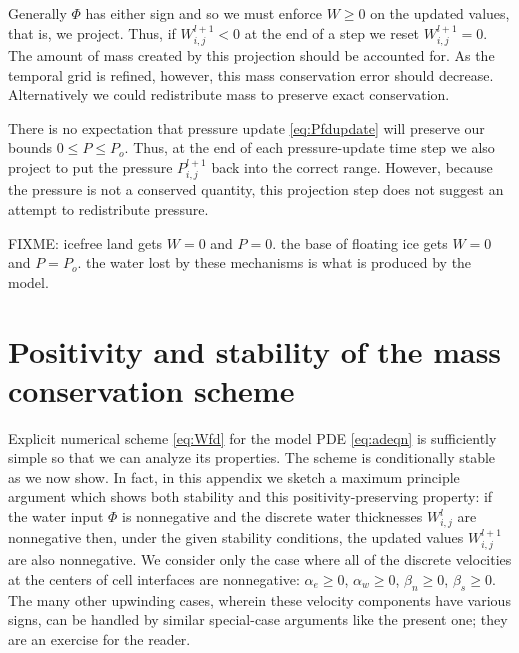 \documentclass[11pt,final]{amsart}%
\newcommand{\Wlij}{W^l_{i,j}}
\begin{document}
Generally $\Phi$ has either sign and so we must enforce $W\ge 0$ on the updated values, that is, we project.  Thus, if $W_{i,j}^{l+1}<0$ at the end of a step we reset $W_{i,j}^{l+1}=0$.  The amount of mass created by this projection should be accounted for.  As the temporal grid is refined, however, this mass conservation error should decrease.  Alternatively we could redistribute mass to preserve exact conservation.

There is no expectation that pressure update \eqref{eq:Pfdupdate} will preserve our bounds $0\le P \le P_o$.  Thus, at the end of each pressure-update time step we also project to put the pressure $P_{i,j}^{l+1}$ back into the correct range.  However, because the pressure is not a conserved quantity, this projection step does not suggest an attempt to redistribute pressure.

FIXME: icefree land gets $W=0$ and $P=0$.  the base of floating ice gets $W=0$ and $P=P_o$.  the water lost by these mechanisms is what is produced by the model.

\small

\normalsize

\appendix

\section{Positivity and stability of the mass conservation scheme}

Explicit numerical scheme \eqref{eq:Wfd} for the model PDE \eqref{eq:adeqn} is sufficiently simple so that we can analyze its properties.  The scheme is conditionally stable as we now show.  In fact, in this appendix we sketch a maximum principle argument \citep{MortonMayers} which shows both stability and this positivity-preserving property: if the water input $\Phi$ is nonnegative and the discrete water thicknesses $\Wlij$ are nonnegative then, under the given stability conditions, the updated values $W_{i,j}^{l+1}$ are also nonnegative.    We consider only the case where all of the discrete velocities at the centers of cell interfaces are nonnegative: $\alpha_e\ge 0$, $\alpha_w\ge 0$, $\beta_n\ge 0$, $\beta_s\ge 0$.  The many other upwinding cases, wherein these velocity components have various signs, can be handled by similar special-case arguments like the present one; they are an exercise for the reader.
\end{document}
